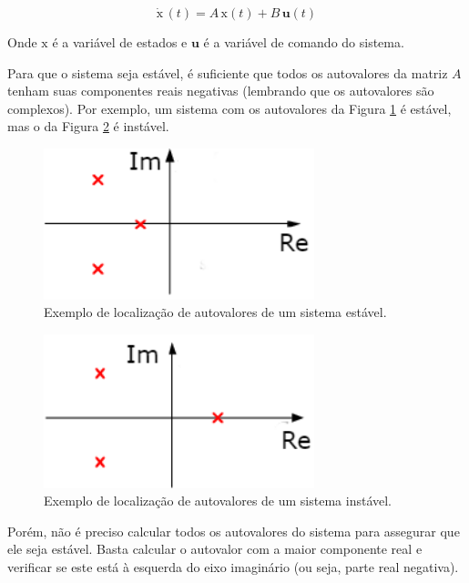 \documentclass[12pt,a4paper,english,brazil]{article}
\begin{document}
\begin{equation}
	\pmb{\dot{\mathrm{x}}} \, (t) = A \, \pmb{\mathrm{x}} (t)  + B \, \pmb{u}(t) 
\end{equation}

Onde $\pmb{\mathrm{x}}$ é a variável de estados e $\pmb{u}$ é a variável de comando do sistema.

Para que o sistema seja estável, é suficiente que todos os autovalores da matriz $A$ tenham suas componentes reais negativas (lembrando que os autovalores são complexos). Por exemplo, um sistema com os autovalores da Figura \ref{fig:estavel} é estável, mas o da Figura \ref{fig:instavel} é instável. \

\begin{figure}[H]
\centering
\includegraphics[width=0.7\textwidth]{estavel.png}
\caption{\label{fig:estavel}Exemplo de localização de autovalores de um sistema estável.}
\end{figure}

\begin{figure}[H]
\centering
\includegraphics[width=0.7\textwidth]{instavel.png}
\caption{\label{fig:instavel}Exemplo de localização de autovalores de um sistema instável.}
\end{figure}

Porém, não é preciso calcular todos os autovalores do sistema para assegurar que ele seja estável. Basta calcular o autovalor com a maior componente real e verificar se este está à esquerda do eixo imaginário (ou seja, parte real negativa). \
\end{document}
